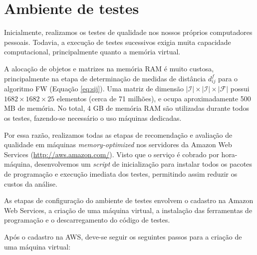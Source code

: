 


\section{Ambiente de testes} %
\label{sec:ambiente_de_testes}

Inicialmente, realizamos os testes de qualidade nos nossos próprios computadores pessoais. Todavia, a execução de testes sucessivos exigia muita capacidade computacional, principalmente quanto a memória virtual.

A alocação de objetos e matrizes na memória RAM é muito custosa, principalmente na etapa de determinação de medidas de distância $d_{ij}^f$ para o algoritmo FW (Equação \ref{eq:sij}). Uma matriz de dimensão $\left|\mathcal{I}\right| \times\left|\mathcal{I}\right| \times\left|\mathcal{F}\right|$ possui $1682 \times 1682 \times 25$ elementos (cerca de 71 milhões), e ocupa aproximadamente 500 MB de memória. No total, 4 GB de memória RAM são utilizadas durante todos os testes, fazendo-se necessário o uso máquinas dedicadas.

Por essa razão, realizamos todas as etapas de recomendação e avaliação de qualidade em máquinas \textit{memory-optimized} nos servidores da Amazon Web Services (\url{http://aws.amazon.com/}). Visto que o serviço é cobrado por hora-máquina, desenvolvemos um \textit{script} de inicialização para instalar todos os pacotes de programação e execução imediata dos testes, permitindo assim reduzir os custos da análise.   

As etapas de configuração do ambiente de testes envolvem o cadastro na Amazon Web Services, a criação de uma máquina virtual, a instalação das ferramentas de programação e o descarregamento do código de testes.

Após o cadastro na AWS, deve-se seguir os seguintes passos para a criação de uma máquina virtual:


